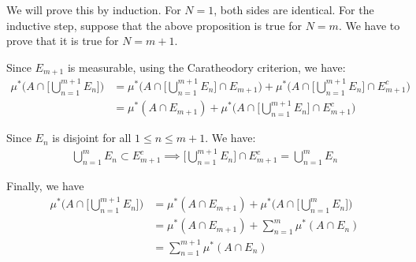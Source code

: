\begin{proof*}
    We will prove this by induction. For $N=1$, both sides are identical. For the inductive step, suppose that the above proposition is true for $N=m$. We have to prove that it is true for $N=m+1$.

    \noindent \newline Since $E_{m+1}$ is measurable, using the Caratheodory criterion, we have:
    \begin{align*}
        \mu^*\Bigg( A \cap \Bigg[ \bigcup_{n=1}^{m+1} E_n \Bigg] \Bigg) 
            &= \mu^*\Bigg( A \cap \Bigg[ \bigcup_{n=1}^{m+1} E_n \Bigg] \cap E_{m+1} \Bigg)
            + \mu^*\Bigg( A \cap \Bigg[ \bigcup_{n=1}^{m+1} E_n \Bigg] \cap E_{m+1}^c \Bigg) \\
            &= \mu^*(A\cap E_{m+1}) + \mu^*\Bigg( A \cap \Bigg[ \bigcup_{n=1}^{m+1} E_n \Bigg] \cap E_{m+1}^c \Bigg)
    \end{align*}

    \noindent \newline Since $E_{n}$ is disjoint for all $1 \le n \le m+1$. We have:
    \begin{align*}
        \bigcup_{n=1}^{m} E_n \subset E_{m+1}^c \implies \Bigg[ \bigcup_{n=1}^{m+1} E_n \Bigg] \cap E_{m+1}^c = \bigcup_{n=1}^m E_n
    \end{align*}

    \noindent \newline Finally, we have
    \begin{align*}
        \mu^*\Bigg( A \cap \Bigg[ \bigcup_{n=1}^{m+1} E_n \Bigg] \Bigg) 
            &= \mu^*(A\cap E_{m+1}) + \mu^*\Bigg( A \cap \Bigg[ \bigcup_{n=1}^{m} E_n \Bigg] \Bigg) \\
            &= \mu^*(A\cap E_{m+1}) + \sum_{n=1}^m \mu^*(A\cap E_n) \\
            &= \sum_{n=1}^{m+1} \mu^*(A\cap E_n)
    \end{align*}
\end{proof*}

